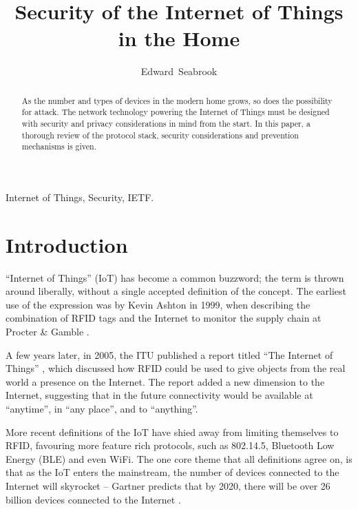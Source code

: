\documentclass[10pt,journal,compsoc]{IEEEtran}
\begin{document}
\title{Security of the Internet of Things in the Home}
\author{Edward~Seabrook }

\maketitle


\begin{abstract}
As the number and types of devices in the modern home grows, so does the
possibility for attack. The network technology powering the Internet of Things
must be designed with security and privacy considerations in mind from the
start. In this paper, a thorough review of the protocol stack, security
considerations and prevention mechanisms is given. 
\end{abstract}

\begin{IEEEkeywords}
Internet of Things, Security, IETF.
\end{IEEEkeywords}

\IEEEpeerreviewmaketitle

\section{Introduction}
 ``Internet of Things'' (IoT) has become a common buzzword;
the term is thrown around liberally, without a single accepted definition
of the concept. The earliest use of the expression was by Kevin Ashton in 1999,
when describing the combination of RFID tags and the Internet to monitor the
supply chain at Procter \& Gamble \cite{Ashton2009}. 

A few years later, in 2005, the ITU published a report titled ``The Internet of
Things'' \cite{ITU_IoT}, which discussed how RFID could be used to give objects
from the real world a presence on the Internet. The report added a new
dimension to the Internet, suggesting that in the future connectivity would be
available at ``anytime'', in ``any place'', and to ``anything''.

More recent definitions of the IoT have shied away from limiting themselves to
RFID, favouring more feature rich protocols, such as 802.14.5, Bluetooth Low
Energy (BLE) and even WiFi. The one core theme that all definitions agree on,
is that as the IoT enters the mainstream, the number of devices connected to
the Internet will skyrocket -- Gartner predicts that by 2020, there will
be over 26 billion devices connected to the Internet \cite{Gartner2014}. 
\end{document}
